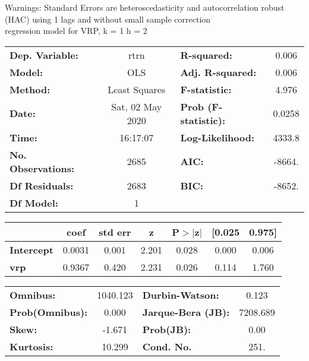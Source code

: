 Warnings: \newline
 [1] Standard Errors are heteroscedasticity and autocorrelation robust (HAC) using 1 lags and without small sample correction\\ 

regression model for VRP, k = 1 h = 2\begin{center}
\begin{tabular}{lclc}
\toprule
\textbf{Dep. Variable:}    &       rtrn       & \textbf{  R-squared:         } &     0.006   \\
\textbf{Model:}            &       OLS        & \textbf{  Adj. R-squared:    } &     0.006   \\
\textbf{Method:}           &  Least Squares   & \textbf{  F-statistic:       } &     4.976   \\
\textbf{Date:}             & Sat, 02 May 2020 & \textbf{  Prob (F-statistic):} &   0.0258    \\
\textbf{Time:}             &     16:17:07     & \textbf{  Log-Likelihood:    } &    4333.8   \\
\textbf{No. Observations:} &        2685      & \textbf{  AIC:               } &    -8664.   \\
\textbf{Df Residuals:}     &        2683      & \textbf{  BIC:               } &    -8652.   \\
\textbf{Df Model:}         &           1      & \textbf{                     } &             \\
\bottomrule
\end{tabular}
\begin{tabular}{lcccccc}
                   & \textbf{coef} & \textbf{std err} & \textbf{z} & \textbf{P$> |$z$|$} & \textbf{[0.025} & \textbf{0.975]}  \\
\midrule
\textbf{Intercept} &       0.0031  &        0.001     &     2.201  &         0.028        &        0.000    &        0.006     \\
\textbf{vrp}       &       0.9367  &        0.420     &     2.231  &         0.026        &        0.114    &        1.760     \\
\bottomrule
\end{tabular}
\begin{tabular}{lclc}
\textbf{Omnibus:}       & 1040.123 & \textbf{  Durbin-Watson:     } &    0.123  \\
\textbf{Prob(Omnibus):} &   0.000  & \textbf{  Jarque-Bera (JB):  } & 7208.689  \\
\textbf{Skew:}          &  -1.671  & \textbf{  Prob(JB):          } &     0.00  \\
\textbf{Kurtosis:}      &  10.299  & \textbf{  Cond. No.          } &     251.  \\
\bottomrule
\end{tabular}
\end{center}

